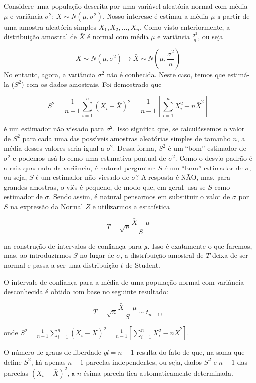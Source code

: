 \documentclass[
]{book}
\begin{document}
Considere uma população descrita por uma variável aleatória normal com média \(\mu\) e variância \(\sigma^2\): \(X\sim N(\mu,\sigma^2)\). Nosso interesse é estimar a média \(\mu\) a partir de uma amostra aleatória simples \(X_1,X_2,\ldots,X_n\). Como visto anteriormente, a distribuição amostral de \(\bar X\) é normal com média \(\mu\) e variância \(\frac{\sigma^2}{n}\), ou seja

\[X\sim N(\mu,\sigma^2)\rightarrow \bar X \sim N\left(\mu,\frac{\sigma^2}{n}\right)\]
No entanto, agora, a variância \(\sigma^2\) não é conhecida. Neste caso, temos que estimá-la (\(S^2\)) com os dados amostrais. Foi demostrado que

\[S^2=\frac{1}{n-1}\sum_{i=1}^{n}(X_i-\bar X)^2=\frac{1}{n-1}\left[\sum_{i=1}^{n}X_i^2-n\bar X^2\right]\]

é um estimador não viesado para \(\sigma^2\). Isso significa que, se calculássemos o valor de \(S^2\) para cada uma das possíveis amostras aleatórias simples de tamanho \(n\), a média desses valores seria igual a \(\sigma^2\). Dessa forma, \(S^2\) é um ``bom'' estimador de \(\sigma^2\) e podemos usá-lo como uma estimativa pontual de \(\sigma^2\). Como o desvio padrão é a raiz quadrada da variância, é natural perguntar: \(S\) é um ``bom'' estimador de \(\sigma\), ou seja, \(S\) é um estimador não-viesado de \(\sigma\)? A resposta é NÃO, mas, para grandes amostras, o viés é pequeno, de modo que, em geral, usa-se \(S\) como estimador de \(\sigma\). Sendo assim, é natural pensarmos em substituir o valor de \(\sigma\) por \(S\) na expressão da Normal \(Z\) e utilizarmos a estatística

\[T=\sqrt{n}\frac{\bar X-\mu}{S}\]

na construção de intervalos de confiança para \(\mu\). Isso é exatamente o que faremos, mas, ao introduzirmos \(S\) no lugar de \(\sigma\), a distribuição amostral de \(T\) deixa de ser normal e passa a ser uma distribuição \(t\) de Student.

O intervalo de confiança para a média de uma população normal com variância desconhecida é obtido com base no seguinte resultado:

\[T=\sqrt{n}\frac{\bar X-\mu}{S}\sim t_{n-1},\]

onde \(S^2=\frac{1}{n-1}\sum_{i=1}^{n}(X_i-\bar X)^2=\frac{1}{n-1}\left[\sum_{i=1}^{n}X_i^2-n\bar X^2\right].\)

O número de graus de liberdade \(gl=n-1\) resulta do fato de que, na soma que define \(S^2\), há apenas \(n-1\) parcelas independentes, ou seja, dados \(S^2\) e \(n-1\) das parcelas \((X_i - \bar X)^2\), a \(n\)-ésima parcela fica automaticamente determinada.
\end{document}
